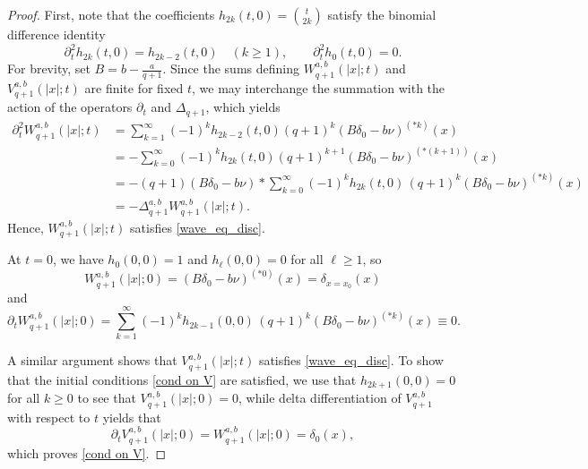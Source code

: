 \documentclass[10pt,a4paper]{amsart}
\begin{document}
\begin{proof}
First, note that the coefficients $h_{2k}(t,0)=\binom{t}{2k}$ satisfy the binomial difference identity
$$
\partial_t^2 h_{2k}(t,0)=h_{2k-2}(t,0)\quad(k\ge1), \qquad \partial_t^2 h_0(t,0)=0.
$$
For brevity, set $B=b-\frac{a}{q+1}$. Since the sums defining $W_{q+1}^{a,b}(|x|;t)$ and $V_{q+1}^{a,b}(|x|;t)$ are finite for fixed $t$, we may interchange the summation with the action of the operators $\partial_t$ and $\Delta_{q+1}$, which yields 
\begin{equation*}
\begin{split}
\partial_t^2 W_{q+1}^{a,b}(|x|;t)
&= \sum_{k=1}^{\infty}(-1)^k h_{2k-2}(t,0)(q+1)^k \left(B\delta_0 -b\nu \right)^{(*k)}(x)\\
&=-\sum_{k=0}^{\infty}(-1)^k h_{2k}(t,0)(q+1)^{k+1} \left( B \delta_0 -b\nu \right)^{(\ast(k+1))}(x)\\
&=
-(q+1)\left(B \delta_0 -b\nu \right)\ast \sum_{k=0}^{\infty} (-1)^k h_{2k}(t,0)\,(q+1)^k \left(B\delta_0 -b\nu \right)^{(*k)}(x) \label{eq. wave eq. prop}\\
&=
-\Delta_{q+1}^{a,b}W_{q+1}^{a,b}(|x|;t).
\end{split}
\end{equation*}
Hence, $W_{q+1}^{a,b}(|x|;t)$ satisfies \eqref{wave_eq_disc}.

\medskip
At $t=0$, we have $h_0(0,0)=1$ and $h_{\ell}(0,0)=0$ for all $\ell\ge1$, so
$$
W_{q+1}^{a,b}(|x|;0)=\left( B\delta_0 - b\nu \right)^{(*0)}(x)= \delta_{x=x_0}(x)
$$
and
$$
\partial_t W_{q+1}^{a,b}(|x|;0)=\sum_{k=1}^{\infty} (-1)^k h_{2k-1}(0,0)\,(q+1)^k \left( B\delta_0 - b\nu \right)^{(*k)}(x)\equiv 0.
$$

A similar argument shows that $V_{q+1}^{a,b}(|x|;t)$ satisfies \eqref{wave_eq_disc}. To show that the initial conditions \eqref{cond on V} are satisfied, we use that $h_{2k+1}(0,0)=0$ for all $k\geq 0$ to see that $V_{q+1}^{a,b}(|x|;0)=0$, while delta differentiation of $V_{q+1}^{a,b}$ with respect to $t$ yields that
$$
\partial_t V_{q+1}^{a,b}(|x|;0)=W_{q+1}^{a,b}(|x|;0)=\delta_0(x),
$$
which proves \eqref{cond on V}.
\end{proof}
\end{document}
